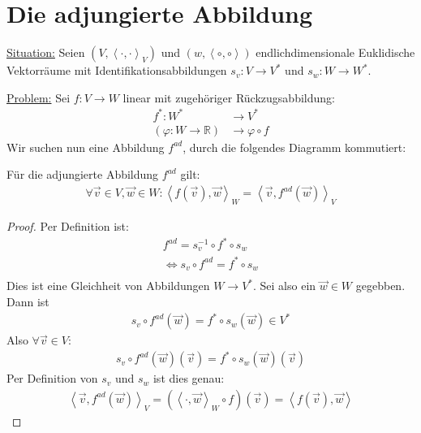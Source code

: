 \documentclass{report}
\newcommand*{\newpar}{\par\vspace{\baselineskip}\noindent}
\newcommand{\ul}[1]{\underline{#1}}
\newcommand{\bR}{\mathbb{R}}
\newcommand{\vv}{\vec{v}}
\newcommand{\vw}{\vec{w}}
\newcommand{\scalar}[2]{\left\langle #1, #2 \right\rangle}
\begin{document}
\section{Die adjungierte Abbildung}
\ul{Situation:} Seien $(V, \scalar{\cdot}{\cdot}_V)$ und $(w, \scalar{\circ}{\circ})$ endlichdimensionale Euklidische Vektorräume mit Identifikationsabbildungen $s_v : V \to V^*$ und $s_w : W \to W^*$.
\newpar
\ul{Problem:} Sei $f : V \to W$ linear mit zugehöriger Rückzugsabbildung:
\begin{align*}
 f^* : W^* &\to V^*\\
 (\varphi : W \to \bR) &\to \varphi \circ f
\end{align*}
Wir suchen nun eine Abbildung $f^{ad}$, durch die folgendes Diagramm kommutiert:
\begin{center}
\end{center}
\begin{theorem}
Für die adjungierte Abbildung $f^{ad}$ gilt:
 \begin{align*}
 \forall \vv \in V, \vw \in W : \scalar{f(\vv)}{\vw}_W = \scalar{\vv}{f^{ad}(\vw)}_V
\end{align*}
\end{theorem}
\begin{proof}
 Per Definition ist:
 \begin{align*}
  f^{ad} = s_v^{-1}  \circ f^* \circ s_w\\
  \Leftrightarrow s_v \circ f^{ad} = f^* \circ s_w\\
 \end{align*}
 Dies ist eine Gleichheit von Abbildungen $W \to V^*$. Sei also ein $\vw \in W$ gegebben. Dann ist
 \begin{align*}
  s_v \circ f^{ad}(\vw) = f^* \circ s_w(\vw) \in V^*
 \end{align*}
 Also $\forall \vv \in V$:
 \begin{align*}
  s_v \circ f^{ad}(\vw)(\vv) = f^* \circ s_w(\vw)(\vv)
 \end{align*}
 Per Definition von $s_v$ und $s_w$ ist dies genau:
 \begin{align*}
  \scalar{\vv}{f^{ad}(\vw)}_V = (\scalar{\cdot}{\vw}_W \circ f)(\vv) = \scalar{f(\vv)}{\vw}
 \end{align*}
\end{proof}
\end{document}
